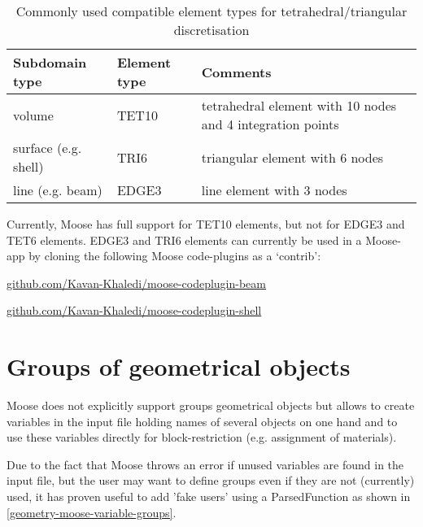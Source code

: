 \begin{table}
    \begin{tabularx}{\textwidth}{@{}lXl@{}}
        \hline
        Subdomain type
                             &
        Element type
                             &
        Comments
        \\

        \hline
        volume
                             &
        TET10
                             &
        tetrahedral element with 10 nodes and 4 integration points
        \\

        surface (e.g. shell) & TRI6  & triangular element with 6 nodes \\

        line (e.g. beam)     & EDGE3 & line element with 3 nodes       \\

        \hline
    \end{tabularx}
    \caption{Commonly used compatible element types for tetrahedral/triangular discretisation}
    \label{tab:geometry-TET-TRI-elements}
\end{table}

Currently, Moose has full support for TET10 elements, but not for EDGE3 and
TET6 elements. EDGE3 and TRI6 elements can currently be used in a Moose-app by
cloning the following Moose code-plugins as a ‘contrib’:

\begin{description}[font=$\bullet$~\normalfont]
    \item [beams:] \href{https://github.com/Kavan-Khaledi/moose-codeplugin-beam}{github.com/Kavan-Khaledi/moose-codeplugin-beam}
    \item [shells:] \href{https://github.com/Kavan-Khaledi/moose-codeplugin-shell}{github.com/Kavan-Khaledi/moose-codeplugin-shell}
\end{description}

\section{Groups of geometrical objects}
\label{geometry-groups}

Moose does not explicitly support groups geometrical objects but allows to
create variables in the input file holding names of several objects on one hand
and to use these variables directly for block-restriction (e.g. assignment of
materials).

Due to the fact that Moose throws an error if unused variables are found in the
input file, but the user may want to define groups even if they are not
(currently) used, it has proven useful to add 'fake users' using a
ParsedFunction as shown in \autoref{geometry-moose-variable-groups}.

